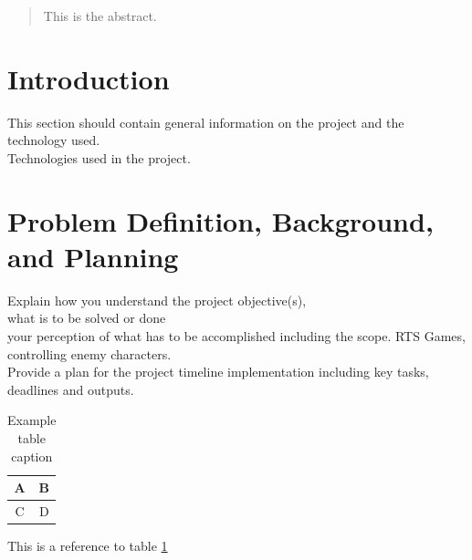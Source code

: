 \documentclass[12pt,a4paper,titlepage]{article}
\begin{document}


\begin{abstract}
This is the abstract.
\end{abstract}

\tableofcontents

\newpage

\listoftables

\newpage

\listoffigures

\newpage

\section{Introduction}
This section should contain general information on the project and the technology used.\\
Technologies used in the project.

\section{Problem Definition, Background, and Planning}

Explain how you understand the project objective(s),\\

what is to be solved or done\\

your perception of what has to be accomplished including the scope. RTS Games, controlling enemy characters.\\

Provide a plan for the project timeline implementation including key tasks, deadlines and outputs.\\

\begin{table}[H] %
\begin{center}

\begin{tabular}{ | c | c |}
\hline
A & B \\ 
\hline
C & D \\
\hline
\end{tabular}
\caption{Example table caption}
\label{table:x Example table}
\end{center}
\end{table}

This is a reference to table \ref{table:x Example table}
\end{document}
